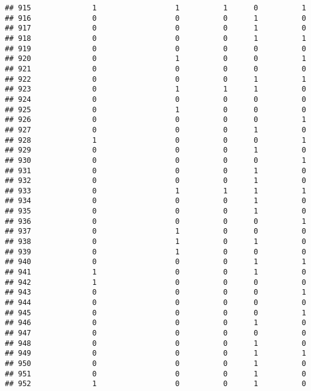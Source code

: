 \documentclass[
]{article}
\begin{document}
\begin{verbatim}
## 915              1                  1          1      0          1
## 916              0                  0          0      1          0
## 917              0                  0          0      1          0
## 918              0                  0          0      1          1
## 919              0                  0          0      0          0
## 920              0                  1          0      0          1
## 921              0                  0          0      0          0
## 922              0                  0          0      1          1
## 923              0                  1          1      1          0
## 924              0                  0          0      0          0
## 925              0                  1          0      0          0
## 926              0                  0          0      0          1
## 927              0                  0          0      1          0
## 928              1                  0          0      0          1
## 929              0                  0          0      1          0
## 930              0                  0          0      0          1
## 931              0                  0          0      1          0
## 932              0                  0          0      1          0
## 933              0                  1          1      1          1
## 934              0                  0          0      1          0
## 935              0                  0          0      1          0
## 936              0                  0          0      0          1
## 937              0                  1          0      0          0
## 938              0                  1          0      1          0
## 939              0                  1          0      0          0
## 940              0                  0          0      1          1
## 941              1                  0          0      1          0
## 942              1                  0          0      0          0
## 943              0                  0          0      0          1
## 944              0                  0          0      0          0
## 945              0                  0          0      0          1
## 946              0                  0          0      1          0
## 947              0                  0          0      0          0
## 948              0                  0          0      1          0
## 949              0                  0          0      1          1
## 950              0                  0          0      1          0
## 951              0                  0          0      1          0
## 952              1                  0          0      1          0

\end{verbatim}
\end{document}
